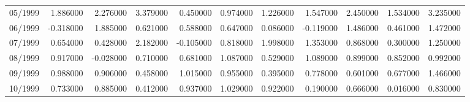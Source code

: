 \begin{tabular}{lrrrrrrrrrr}
05/1999 & 1.886000 & 2.276000 & 3.379000 & 0.450000 & 0.974000 & 1.226000 & 1.547000 & 2.450000 & 1.534000 & 3.235000 \\
06/1999 & -0.318000 & 1.885000 & 0.621000 & 0.588000 & 0.647000 & 0.086000 & -0.119000 & 1.486000 & 0.461000 & 1.472000 \\
07/1999 & 0.654000 & 0.428000 & 2.182000 & -0.105000 & 0.818000 & 1.998000 & 1.353000 & 0.868000 & 0.300000 & 1.250000 \\
08/1999 & 0.917000 & -0.028000 & 0.710000 & 0.681000 & 1.087000 & 0.529000 & 1.089000 & 0.899000 & 0.852000 & 0.992000 \\
09/1999 & 0.988000 & 0.906000 & 0.458000 & 1.015000 & 0.955000 & 0.395000 & 0.778000 & 0.601000 & 0.677000 & 1.466000 \\
10/1999 & 0.733000 & 0.885000 & 0.412000 & 0.937000 & 1.029000 & 0.922000 & 0.190000 & 0.666000 & 0.016000 & 0.830000 \\
\bottomrule
\end{tabular}
